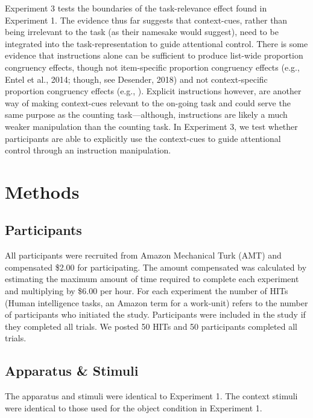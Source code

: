 \documentclass[english,,man,floatsintext]{apa6}
\begin{document}
Experiment 3 tests the boundaries of the task-relevance effect found in Experiment 1. The evidence thus far suggests that context-cues, rather than being irrelevant to the task (as their namesake would suggest), need to be integrated into the task-representation to guide attentional control. There is some evidence that instructions alone can be sufficient to produce list-wide proportion congruency effects, though not item-specific proportion congruency effects (e.g., Entel et al., 2014; though, see Desender, 2018) and not context-specific proportion congruency effects (e.g., ). Explicit instructions however, are another way of making context-cues relevant to the on-going task and could serve the same purpose as the counting task---although, instructions are likely a much weaker manipulation than the counting task. In Experiment 3, we test whether participants are able to explicitly use the context-cues to guide attentional control through an instruction manipulation.

\hypertarget{methods-2}{%
\section{Methods}\label{methods-2}}

\hypertarget{participants-2}{%
\subsection{Participants}\label{participants-2}}

All participants were recruited from Amazon Mechanical Turk (AMT) and compensated \$2.00 for participating. The amount compensated was calculated by estimating the maximum amount of time required to complete each experiment and multiplying by \$6.00 per hour. For each experiment the number of HITs (Human intelligence tasks, an Amazon term for a work-unit) refers to the number of participants who initiated the study. Participants were included in the study if they completed all trials. We posted 50 HITs and 50 participants completed all trials.

\hypertarget{apparatus-stimuli-2}{%
\subsection{Apparatus \& Stimuli}\label{apparatus-stimuli-2}}

The apparatus and stimuli were identical to Experiment 1. The context stimuli were identical to those used for the object condition in Experiment 1.
\end{document}
